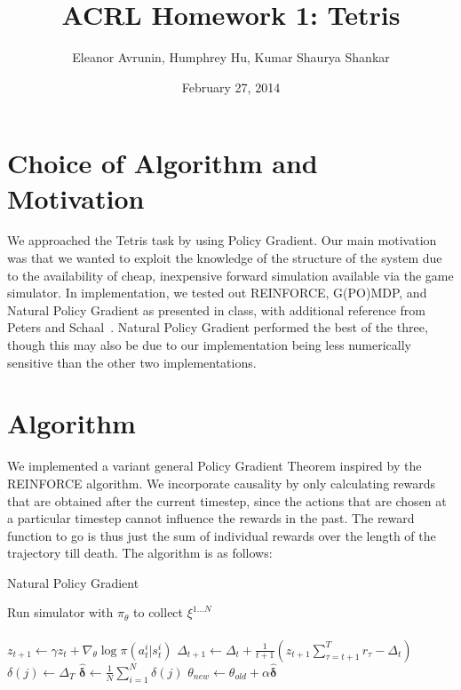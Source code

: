\documentclass[11pt]{article}
\begin{document}
  

\title{ACRL Homework 1:  Tetris}
\date{February 27, 2014}
\author{Eleanor Avrunin, Humphrey Hu, Kumar Shaurya Shankar}

\maketitle

\section{Choice of Algorithm and Motivation}
We approached the Tetris task by using Policy Gradient. Our main motivation was that we wanted to exploit the knowledge of the structure of the system due to the availability of cheap, inexpensive forward simulation available via the game simulator. In implementation, we tested out REINFORCE, G(PO)MDP, and Natural Policy Gradient as presented in class, with additional reference from Peters and Schaal~\cite{Peters2006:Robotics}. Natural Policy Gradient performed the best of the three, though this may also be due to our implementation being less numerically sensitive than the other two implementations. 

\section{Algorithm}
We implemented a variant general Policy Gradient Theorem inspired by the REINFORCE algorithm. We incorporate causality by only calculating rewards that are obtained after the current timestep, since the actions that are chosen at a particular timestep cannot influence the rewards in the past. The reward function to go is thus just the sum of individual rewards over the length of the trajectory till death. The algorithm is as follows:

\begin{algorithm}
\caption{Natural Policy Gradient}
\label{reinforce_alg}
\begin{algorithmic}
\STATE Run simulator with $\pi_{\theta}$ to collect $\xi^{1...N}$\\
\\
\STATE $z_{t+1} \gets \gamma z_t + \nabla_{\theta}\log\pi\left(a_{t}^{i}|s_{t}^{i} \right)$
\STATE $\Delta_{t+1} \gets \Delta_t + \frac{1}{t+1} \left( z_{t+1} \sum_{\tau = t+1}^{T}{r_\tau} - \Delta_t\right)$
\ENDFOR
\STATE $\delta(j) \gets \Delta_T$
\ENDFOR
\STATE $\hat{\mathbf{\delta}} \gets \frac{1}{N} \sum_{i=1}^{N} \delta(j)$
\STATE $\theta_{new} \gets  \theta_{old}+\alpha\hat{\mathbf{\delta}}$
\ENDFOR
\end{algorithmic}
\end{algorithm}
\end{document}

